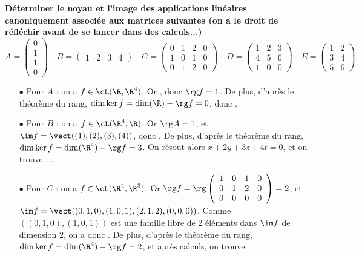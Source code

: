 \documentclass[a4paper, 11pt,reqno]{article}
\begin{document}
\begin{correction}  \;
	\textbf{D\'eterminer le noyau et l'image des applications lin\'eaires canoniquement associ\'ee aux matrices suivantes (on a le droit de r\'efl\'echir avant de se lancer dans des calculs...)}
	$$A=\left(\begin{array}{l} 0\\ 1\\ 1\\0  \end{array}\right)\quad B=\left(\begin{array}{llll} 1&2&3&4 \end{array}\right)\quad
		C=\left(\begin{array}{llll} 0&1&2&0\\ 1&0&1&0\\ 0&1&2&0  \end{array}\right)\quad
		D=\left(\begin{array}{lll} 1&2&3\\ 4&5&6\\ 1&0&0  \end{array}\right)\quad E=\left(\begin{array}{ll} 1&2\\ 3&4\\ 5&6  \end{array}\right).$$
	\begin{itemize}
		\item[$\bullet$] Pour $A$ : on a $f \in \cL(\R,\R^4)$. Or , donc $\rg f = 1$. De plus, d'apr\`es le th\'eor\`eme du rang, $\dim \ker f = \dim(\R) - \rg f = 0$, donc .
		\item[$\bullet$] Pour $B$ : on a $f \in \cL(\R^4,\R)$. Or $\rg A = 1$, et $\im f = \vect((1),(2),(3),(4))$, donc . De plus, d'apr\`es le th\'eor\`eme du rang, $\dim \ker f = \dim(\R^4) - \rg f = 3$. On r\'esout alors $x+2y+3z+4t=0$, et on trouve : .
		\item[$\bullet$] Pour $C$ : on a $f \in \cL(\R^4,\R^3)$. Or $\rg f = \rg \left(\begin{array}{llll}  1&0&1&0\\ 0&1&2&0\\  0&0&0&0 \end{array}\right) = 2$, et $\im f = \vect((0,1,0),(1,0,1),(2,1,2),(0,0,0))$. Comme $((0,1,0),(1,0,1))$ est une famille libre de $2$ \'el\'ements dans $\im f$ de dimension $2$, on a donc . De plus, d'apr\`es le th\'eor\`eme du rang, $\dim \ker f = \dim(\R^4) - \rg f = 2$, et apr\`es calculs, on trouve .

\end{itemize}
\end{correction}
\end{document}
